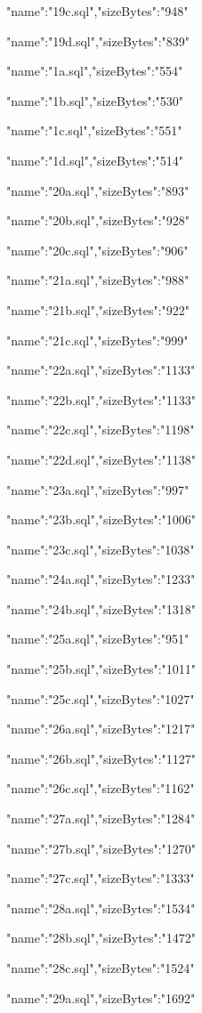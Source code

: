 \documentclass[11pt,a4paper]{article}
\begin{document}
{"name":"19c.sql","sizeBytes":"948"}

{"name":"19d.sql","sizeBytes":"839"}

{"name":"1a.sql","sizeBytes":"554"}

{"name":"1b.sql","sizeBytes":"530"}

{"name":"1c.sql","sizeBytes":"551"}

{"name":"1d.sql","sizeBytes":"514"}

{"name":"20a.sql","sizeBytes":"893"}

{"name":"20b.sql","sizeBytes":"928"}

{"name":"20c.sql","sizeBytes":"906"}

{"name":"21a.sql","sizeBytes":"988"}

{"name":"21b.sql","sizeBytes":"922"}

{"name":"21c.sql","sizeBytes":"999"}

{"name":"22a.sql","sizeBytes":"1133"}

{"name":"22b.sql","sizeBytes":"1133"}

{"name":"22c.sql","sizeBytes":"1198"}

{"name":"22d.sql","sizeBytes":"1138"}

{"name":"23a.sql","sizeBytes":"997"}

{"name":"23b.sql","sizeBytes":"1006"}

{"name":"23c.sql","sizeBytes":"1038"}

{"name":"24a.sql","sizeBytes":"1233"}

{"name":"24b.sql","sizeBytes":"1318"}

{"name":"25a.sql","sizeBytes":"951"}

{"name":"25b.sql","sizeBytes":"1011"}

{"name":"25c.sql","sizeBytes":"1027"}

{"name":"26a.sql","sizeBytes":"1217"}

{"name":"26b.sql","sizeBytes":"1127"}

{"name":"26c.sql","sizeBytes":"1162"}

{"name":"27a.sql","sizeBytes":"1284"}

{"name":"27b.sql","sizeBytes":"1270"}

{"name":"27c.sql","sizeBytes":"1333"}

{"name":"28a.sql","sizeBytes":"1534"}

{"name":"28b.sql","sizeBytes":"1472"}

{"name":"28c.sql","sizeBytes":"1524"}

{"name":"29a.sql","sizeBytes":"1692"}
\end{document}
